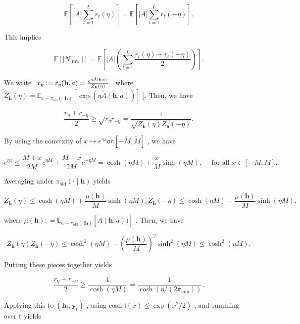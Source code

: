 \documentclass[
  10
]{article}
\begin{document}
\[
\mathbb {E} \left[ | A | \sum_ {t = 1} ^ {L} r _ {t} (\eta) \right] = \mathbb {E} \left[ | A | \sum_ {t = 1} ^ {L} r _ {t} (- \eta) \right].
\]

This implies

\[
\mathbb {E} [ | N _ {\text { raw }} | ] = \mathbb {E} \left[ | A | \left(\sum_ {t = 1} ^ {L} \frac {r _ {t} (\eta) + r _ {t} (- \eta)}{2}\right) \right].
\]

We write
\(\begin{array} { r } { r _ { \eta } : = r _ { \eta } ( { \bf h } , a ) = \frac { e ^ { \eta \tilde { A } ( { \bf h } , a ) } } { Z _ { \bf h } ( \eta ) } } \end{array}\)
where
\(Z _ { \mathbf { h } } ( \eta ) = \mathbb { E } _ { a \sim \pi _ { \mathrm { o l d } } ( \cdot | \mathbf { h } ) } [ \exp ( \eta \tilde { A } ( \mathbf { h } , a ) ) ]\)
{]}. Then, we have

\[
\frac {r _ {\eta} + r _ {- \eta}}{2} \geq \sqrt {r _ {\eta} r _ {- \eta}} = \frac {1}{\sqrt {Z _ {\mathbf {h}} (\eta) Z _ {\mathbf {h}} (- \eta)}}.
\]

By using the convexity of
\(x \mapsto e ^ { \eta x } \mathsf { o n } \left[ - \widetilde { M } , \widetilde { M } \right]\)
, we have

\[
e ^ {\eta x} \leq \frac {M + x}{2 M} e ^ {\eta M} + \frac {M - x}{2 M} e ^ {- \eta M} = \cosh (\eta M) + \frac {x}{M} \sinh (\eta M), \quad \text { for   all } x \in [ - M, M ].
\]

Averaging under
\(\pi _ { \mathrm { o l d } } ( \cdot \mid \mathbf { h } )\) yields

\[
Z _ {\mathbf {h}} (\eta) \leq \cosh (\eta M) + \frac {\mu (\mathbf {h})}{M} \sinh (\eta M), Z _ {\mathbf {h}} (- \eta) \leq \cosh (\eta M) - \frac {\mu (\mathbf {h})}{M} \sinh (\eta M),
\]

where
\(\mu ( \mathbf { h } ) : = \mathbb { E } _ { a \sim \pi _ { \mathrm { o l d } } ( \cdot | \mathbf { h } ) } [ \tilde { A } ( \mathbf { h } , a ) ) ]\)
. Then, we have

\[
Z _ {\mathbf {h}} (\eta) Z _ {\mathbf {h}} (- \eta) \leq \cosh^ {2} (\eta M) - \left(\frac {\mu (\mathbf {h})}{M}\right) ^ {2} \sinh^ {2} (\eta M) \leq \cosh^ {2} (\eta M).
\]

Putting these pieces together yields

\[
\frac {r _ {\eta} + r _ {- \eta}}{2} \geq \frac {1}{\cosh (\eta M)} = \frac {1}{\cosh (\eta / (2 \pi_ {\mathrm{min}}))}.
\]

Applying this to
\(\left( \mathbf { h } _ { t } , \mathbf { y } _ { t } \right)\) , using
cosh \(\mathfrak { i } ( x ) \le \exp ( x ^ { 2 } / 2 )\) , and summing
over t yields
\end{document}
